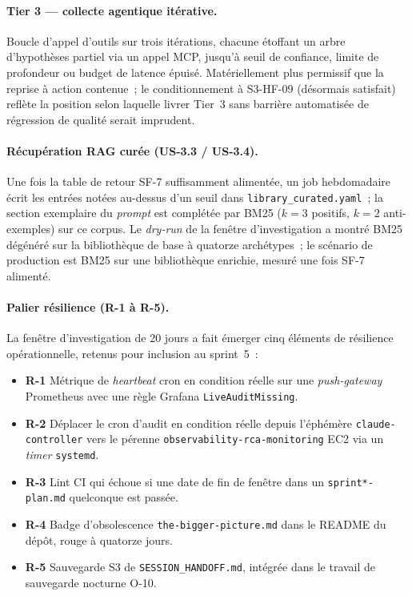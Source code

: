 \documentclass[11pt,a4paper,oneside]{report}
\begin{document}
\paragraph{Tier 3 --- collecte agentique itérative.}
Boucle d'appel d'outils sur trois itérations, chacune étoffant un
arbre d'hypothèses partiel via un appel MCP, jusqu'à seuil de
confiance, limite de profondeur ou budget de latence épuisé.
Matériellement plus permissif que la reprise à action contenue~;
le conditionnement à S3-HF-09 (désormais satisfait) reflète la
position selon laquelle livrer Tier~3 sans barrière automatisée de
régression de qualité serait imprudent.

\paragraph{Récupération RAG curée (US-3.3 / US-3.4).}
Une fois la table de retour SF-7 suffisamment alimentée, un job
hebdomadaire écrit les entrées notées au-dessus d'un seuil dans
\texttt{library\_curated.yaml}~; la section exemplaire du
\emph{prompt} est complétée par BM25 ($k=3$ positifs, $k=2$
anti-exemples) sur ce corpus. Le \emph{dry-run} de la fenêtre
d'investigation a montré BM25 dégénéré sur la bibliothèque de base
à quatorze archétypes~; le scénario de production est BM25 sur une
bibliothèque enrichie, mesuré une fois SF-7 alimenté.

\paragraph{Palier résilience (R-1 à R-5).}
La fenêtre d'investigation de 20 jours a fait émerger cinq
éléments de résilience opérationnelle, retenus pour inclusion au
sprint~5~:

\begin{itemize}
  \item \textbf{R-1} Métrique de \emph{heartbeat} cron en
        condition réelle sur une \emph{push-gateway} Prometheus
        avec une règle Grafana \texttt{LiveAuditMissing}.
  \item \textbf{R-2} Déplacer le cron d'audit en condition réelle
        depuis l'éphémère \texttt{claude-controller} vers le
        pérenne \texttt{observability-rca-monitoring} EC2 via un
        \emph{timer} \texttt{systemd}.
  \item \textbf{R-3} Lint CI qui échoue si une date de fin de
        fenêtre dans un \texttt{sprint*-plan.md} quelconque est
        passée.
  \item \textbf{R-4} Badge d'obsolescence
        \texttt{the-bigger-picture.md} dans le README du dépôt,
        rouge à quatorze jours.
  \item \textbf{R-5} Sauvegarde S3 de \texttt{SESSION\_HANDOFF.md},
        intégrée dans le travail de sauvegarde nocturne O-10.
\end{itemize}
\end{document}
